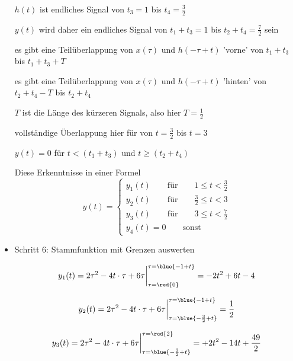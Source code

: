 \begin{ExCalc}
\begin{itemize}
  $h(t)$ ist endliches Signal von $t_3=1$ bis $t_4=\frac{3}{2}$

  $y(t)$ wird daher ein endliches Signal von $t_1+t_3=1$ bis $t_2+t_4=\frac{7}{2}$ sein

  es gibt eine Teilüberlappung von $x(\tau)$ und $h(-\tau+t)$  'vorne' von
  $t_1+t_3$ bis $t_1+t_3+T$

  es gibt eine Teilüberlappung von $x(\tau)$ und $h(-\tau+t)$  'hinten' von
  $t_2+t_4-T$ bis $t_2+t_4$

  $T$ ist die Länge des kürzeren Signals, also hier $T=\frac{1}{2}$

  vollständige Überlappung hier für von $t = \frac{3}{2}$ bis $t=3$

  $y(t)=0$ für $t<(t_1+t_3)$ und $t\geq(t_2+t_4)$

  Diese Erkenntnisse in einer Formel
  \begin{equation}
  y(t) =
  \begin{cases}
    y_1(t) \qquad \mathrm{für} \qquad 1 \leq t < \frac{3}{2}\\
    y_2(t) \qquad \mathrm{für} \qquad \frac{3}{2} \leq t < 3\\
    y_3(t) \qquad \mathrm{für} \qquad 3 \leq t < \frac{7}{2}\\
    y_4(t)=0 \qquad \mathrm{sonst}
  \end{cases}
  \end{equation}

  \item Schritt 6:  Stammfunktion mit Grenzen auswerten

  \begin{equation}
  y_1(t) = 2 \tau^2 - 4 t \cdot \tau + 6 \tau\bigg|_{\tau=\red{0}}^{\tau=\blue{-1+t}}
  = -2 t^2 + 6 t - 4
  \end{equation}

  \begin{equation}
  y_2(t) = 2 \tau^2 - 4 t \cdot \tau + 6 \tau\bigg|_{\tau=\blue{-\frac{3}{2}+t}}^{\tau=\blue{-1+t}}  = \frac{1}{2}
  \end{equation}

  \begin{equation}
  y_3(t) = 2 \tau^2 - 4 t \cdot \tau + 6 \tau\bigg|_{\tau=\blue{-\frac{3}{2}+t}}^{\tau=\red{2}} = +2 t^2 - 14 t + \frac{49}{2}
  \end{equation}

\end{itemize}
\end{ExCalc}


